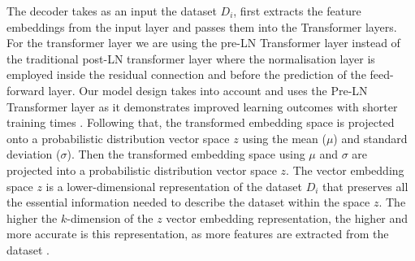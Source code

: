 The decoder takes as an input the dataset $D_i$, first extracts the feature embeddings from the input layer and passes them into the Transformer layers. For the transformer layer we are using the pre-LN Transformer layer \cite{b3PreNormTL} instead of the traditional post-LN transformer layer where the normalisation layer is employed inside the residual connection and before the prediction of the feed-forward layer. Our model design takes into account and uses the Pre-LN Transformer layer as it demonstrates improved learning outcomes with shorter training times \cite{b3PreNormTL}. %
Following that, the transformed embedding space is projected onto a probabilistic distribution vector space $z$ using the mean ($\mu$) and standard deviation ($\sigma$). Then the transformed embedding space using $\mu$ and $\sigma$ are projected into a probabilistic distribution vector space $z$. 
The vector embedding space $z$ is a lower-dimensional representation of the dataset $D_i$ that preserves all the essential information needed to describe the dataset within the space $z$. %
The higher the $k$-dimension of the $z$ vector embedding representation, the higher and more accurate is this representation, as more features are extracted from the dataset \cite{b12Dataset2Vec}.%




